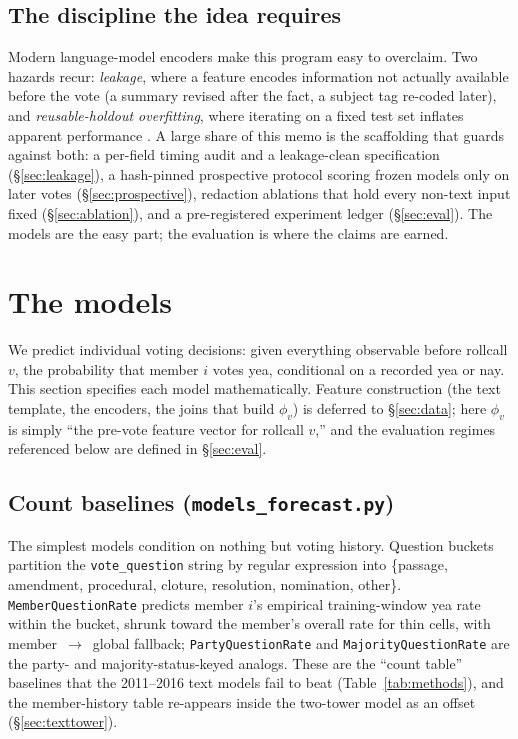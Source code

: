 \documentclass[11pt]{article}
\newcommand{\code}[1]{\texttt{#1}}
\begin{document}
\subsection{The discipline the idea requires}

Modern language-model encoders make this program easy to overclaim.
Two hazards recur: \emph{leakage}, where a feature encodes information
not actually available before the vote (a summary revised after the
fact, a subject tag re-coded later), and \emph{reusable-holdout
overfitting}, where iterating on a fixed test set inflates apparent
performance \citep{dwork2015holdout}. A large share of this memo is the
scaffolding that guards against both: a per-field timing audit and a
leakage-clean specification (\S\ref{sec:leakage}), a hash-pinned
prospective protocol scoring frozen models only on later votes
(\S\ref{sec:prospective}), redaction ablations that hold every non-text
input fixed (\S\ref{sec:ablation}), and a pre-registered experiment
ledger (\S\ref{sec:eval}). The models are the easy part; the evaluation
is where the claims are earned.

\section{The models}
\label{sec:models}

We predict individual voting decisions: given everything observable
before rollcall $v$, the probability that member $i$ votes yea,
conditional on a recorded yea or nay. This section specifies each model
mathematically. Feature construction (the text template, the encoders,
the joins that build $\phi_v$) is deferred to \S\ref{sec:data}; here
$\phi_v$ is simply ``the pre-vote feature vector for rollcall $v$,''
and the evaluation regimes referenced below are defined in
\S\ref{sec:eval}.

\subsection{Count baselines (\code{models\_forecast.py})}

The simplest models condition on nothing but voting history. Question
buckets partition the \code{vote\_question} string by regular
expression into \{passage, amendment, procedural, cloture, resolution,
nomination, other\}. \code{MemberQuestionRate} predicts member $i$'s
empirical training-window yea rate within the bucket, shrunk toward the
member's overall rate for thin cells, with member~$\to$~global
fallback; \code{PartyQuestionRate} and \code{MajorityQuestionRate} are
the party- and majority-status-keyed analogs. These are the ``count
table'' baselines that the 2011--2016 text models fail to beat
(Table~\ref{tab:methods}), and the member-history table re-appears inside
the two-tower model as an offset (\S\ref{sec:texttower}).
\end{document}
